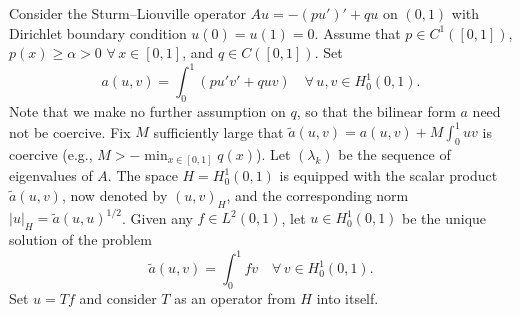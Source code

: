 \documentclass[12pt]{article}
\newcommand{\abs}[1]{\left|#1\right|}
\begin{document}
Consider the Sturm--Liouville operator $Au = -(pu')' + qu$ on $(0,1)$ with Dirichlet
boundary condition $u(0) = u(1) = 0$. Assume that $p \in C^1([0,1])$, $p(x) \ge \alpha > 0$
$\forall\, x \in [0,1]$, and $q \in C([0,1])$. Set
\[
a(u,v) = \int_0^1 (pu'v' + quv) \quad \forall\, u, v \in H^1_0(0,1).
\]
Note that we make no further assumption on $q$, so that the bilinear form $a$ need not
be coercive. Fix $M$ sufficiently large that $\tilde{a}(u,v) = a(u,v) + M\int_0^1 uv$ is
coercive (e.g., $M > -\min_{x \in [0,1]} q(x)$). Let $(\lambda_k)$ be the sequence of eigenvalues of $A$.
The space $H = H^1_0(0,1)$ is equipped with the scalar product $\tilde{a}(u,v)$, now denoted by
$(u,v)_H$, and the corresponding norm $\abs{u}_H = \tilde{a}(u,u)^{1/2}$. Given any $f \in L^2(0,1)$,
let $u \in H^1_0(0,1)$ be the unique solution of the problem
\[
\tilde{a}(u,v) = \int_0^1 fv \quad \forall\, v \in H^1_0(0,1).
\]
Set $u = Tf$ and consider $T$ as an operator from $H$ into itself.
 
\end{document}
